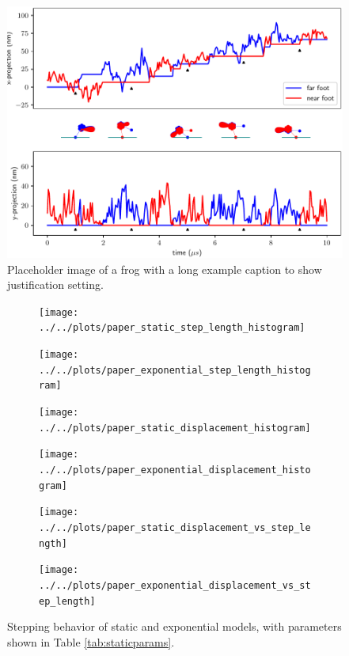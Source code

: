 \documentclass[9pt,twocolumn,twoside]{pnas-new}
\begin{document}
\begin{figure}[tbhp]
\centering
\includegraphics[width=\linewidth]{../../plots/paper_trajectory_plot.pdf}
\caption{Placeholder image of a frog with a long example caption to show justification setting.}
\label{fig:trajectory}
\end{figure}


\begin{figure}[tbhp]
  \begin{subfigure}{0.5\textwidth}
    \centering
    \texttt{[image: ../../plots/paper\_static\_step\_length\_histogram]}
  \end{subfigure}%
  \begin{subfigure}{0.5\textwidth}
    \centering
    \texttt{[image: ../../plots/paper\_exponential\_step\_length\_histogram]}
  \end{subfigure}
  \begin{subfigure}{0.5\textwidth}
    \centering
    \texttt{[image: ../../plots/paper\_static\_displacement\_histogram]}
  \end{subfigure}%
  \begin{subfigure}{0.5\textwidth}
    \centering
    \texttt{[image: ../../plots/paper\_exponential\_displacement\_histogram]}
  \end{subfigure}
  \begin{subfigure}{0.5\textwidth}
    \centering
    \texttt{[image: ../../plots/paper\_static\_displacement\_vs\_step\_length]}
  \end{subfigure}%
  \begin{subfigure}{0.5\textwidth}
    \centering
    \texttt{[image: ../../plots/paper\_exponential\_displacement\_vs\_step\_length]}
  \end{subfigure}
\caption{Stepping behavior of static and exponential models, with parameters shown in Table \ref{tab:staticparams}.}
\label{fig:lengthhist}
\end{figure}
\end{document}
